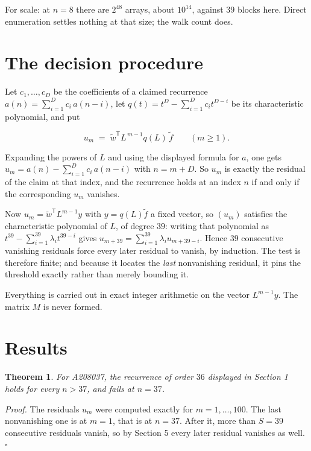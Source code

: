 \documentclass[11pt]{article}
\newtheorem{theorem}{Theorem}
\theoremstyle{definition}
\begin{document}
For scale: at $n = 8$ there are $2^{48}$ arrays, about $10^{14}$, against $39$ blocks here. Direct enumeration settles nothing at that size; the walk count does.

\section{The decision procedure}

Let $c_1,\dots,c_D$ be the coefficients of a claimed recurrence $a(n) = \sum_{i=1}^{D} c_i\,a(n-i)$, let $q(t) = t^{D} - \sum_{i=1}^{D} c_i t^{D-i}$ be its characteristic polynomial, and put

\[u_m \;=\; \tilde w^{\mathsf T} L^{\,m-1} q(L)\,\tilde f \qquad (m \ge 1).\]

Expanding the powers of $L$ and using the displayed formula for $a$, one gets $u_m = a(n) - \sum_{i=1}^{D} c_i\,a(n-i)$ with $n = m + D$. So $u_m$ is exactly the residual of the claim at that index, and the recurrence holds at an index $n$ if and only if the corresponding $u_m$ vanishes.

Now $u_m = \tilde w^{\mathsf T} L^{m-1} y$ with $y = q(L)\tilde f$ a fixed vector, so $(u_m)$ satisfies the characteristic polynomial of $L$, of degree $39$: writing that polynomial as $t^{39} - \sum_{i=1}^{39} \lambda_i t^{39-i}$ gives $u_{m+39} = \sum_{i=1}^{39} \lambda_i u_{m+39-i}$. Hence $39$ consecutive vanishing residuals force every later residual to vanish, by induction. The test is therefore finite; and because it locates the {\itshape last} nonvanishing residual, it pins the threshold exactly rather than merely bounding it.

Everything is carried out in exact integer arithmetic on the vector $L^{m-1}y$. The matrix $M$ is never formed.

\section{Results}

\begin{theorem} For A208037, the recurrence of order $36$ displayed in Section 1 holds for every $n > 37$, and fails at $n = 37$.\end{theorem}

{\itshape Proof.} The residuals $u_m$ were computed exactly for $m = 1,\dots,100$. The last nonvanishing one is at $m = 1$, that is at $n = 37$. After it, more than $S = 39$ consecutive residuals vanish, so by Section 5 every later residual vanishes as well. $\square$
\end{document}
